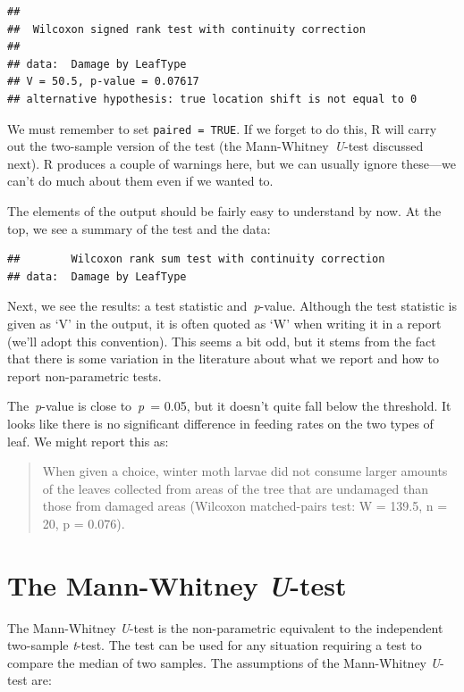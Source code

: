 \documentclass[
]{book}
\begin{document}
\begin{verbatim}
## 
##  Wilcoxon signed rank test with continuity correction
## 
## data:  Damage by LeafType
## V = 50.5, p-value = 0.07617
## alternative hypothesis: true location shift is not equal to 0
\end{verbatim}

We must remember to set \texttt{paired\ =\ TRUE}. If we forget to do this, R will carry out the two-sample version of the test (the Mann-Whitney~\emph{U}-test discussed next). R produces a couple of warnings here, but we can usually ignore these---we can't do much about them even if we wanted to.

The elements of the output should be fairly easy to understand by now. At the top, we see a summary of the test and the data:

\begin{verbatim}
##        Wilcoxon rank sum test with continuity correction
## data:  Damage by LeafType
\end{verbatim}

Next, we see the results: a test statistic and~\emph{p}-value. Although the test statistic is given as `V' in the output, it is often quoted as `W' when writing it in a report (we'll adopt this convention). This seems a bit odd, but it stems from the fact that there is some variation in the literature about what we report and how to report non-parametric tests.

The~\emph{p}-value is close to~\emph{p}~= 0.05, but it doesn't quite fall below the threshold. It looks like there is no significant difference in feeding rates on the two types of leaf. We might report this as:

\begin{quote}
When given a choice, winter moth larvae did not consume larger amounts of the leaves collected from areas of the tree that are undamaged than those from damaged areas (Wilcoxon matched-pairs test: W = 139.5, n = 20, p = 0.076).
\end{quote}

\hypertarget{mann-whitney}{%
\section{\texorpdfstring{The Mann-Whitney \emph{U}-test}{The Mann-Whitney U-test}}\label{mann-whitney}}

The Mann-Whitney \emph{U}-test is the non-parametric equivalent to the independent two-sample \emph{t}-test. The test can be used for any situation requiring a test to compare the median of two samples. The assumptions of the Mann-Whitney \emph{U}-test are:
\end{document}
